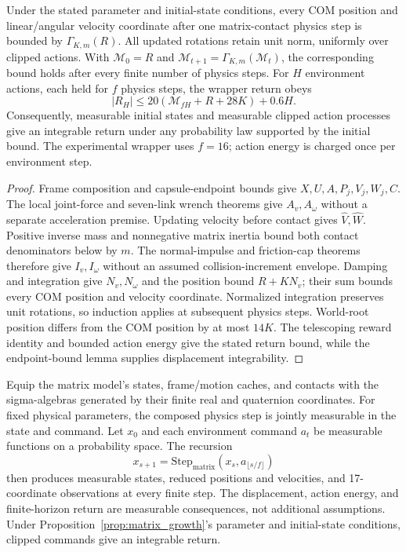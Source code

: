 \begin{proposition}
\label{prop:matrix_growth}
Under the stated parameter and initial-state conditions, every COM position and linear/angular velocity coordinate after one matrix-contact physics step is bounded by $\Gamma_{K,m}(R)$.
All updated rotations retain unit norm, uniformly over clipped actions.
With $\mathcal M_0=R$ and $\mathcal M_{t+1}=\Gamma_{K,m}(\mathcal M_t)$, the corresponding bound holds after every finite number of physics steps.
For $H$ environment actions, each held for $f$ physics steps, the wrapper return obeys
\begin{equation}
 |R_H|\le20(\mathcal M_{fH}+R+28K)+0.6H.
\end{equation}
Consequently, measurable initial states and measurable clipped action processes give an integrable return under any probability law supported by the initial bound.
The experimental wrapper uses $f=16$; action energy is charged once per environment step.
\end{proposition}

\begin{proof}
Frame composition and capsule-endpoint bounds give $X,U,A,P_j,V_j,W_j,C$.
The local joint-force and seven-link wrench theorems give $A_v,A_\omega$ without a separate acceleration premise.
Updating velocity before contact gives $\widehat V,\widehat W$.
Positive inverse mass and nonnegative matrix inertia bound both contact denominators below by $m$.
The normal-impulse and friction-cap theorems therefore give $I_v,I_\omega$ without an assumed collision-increment envelope.
Damping and integration give $N_v,N_\omega$ and the position bound $R+KN_v$; their sum bounds every COM position and velocity coordinate.
Normalized integration preserves unit rotations, so induction applies at subsequent physics steps.
World-root position differs from the COM position by at most $14K$.
The telescoping reward identity and bounded action energy give the stated return bound, while the endpoint-bound lemma supplies displacement integrability.
\end{proof}

\begin{proposition}
\label{prop:matrix_measurable}
Equip the matrix model's states, frame/motion caches, and contacts with the sigma-algebras generated by their finite real and quaternion coordinates.
For fixed physical parameters, the composed physics step is jointly measurable in the state and command.
Let $x_0$ and each environment command $a_t$ be measurable functions on a probability space.
The recursion
\begin{equation}
 x_{s+1}=\mathrm{Step}_{\mathrm{matrix}}(x_s,a_{\lfloor s/f\rfloor})
\end{equation}
then produces measurable states, reduced positions and velocities, and 17-coordinate observations at every finite step.
The displacement, action energy, and finite-horizon return are measurable consequences, not additional assumptions.
Under Proposition~\ref{prop:matrix_growth}'s parameter and initial-state conditions, clipped commands give an integrable return.
\end{proposition}

